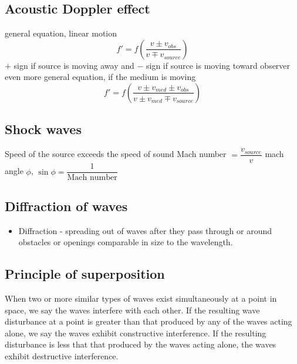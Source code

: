 \documentclass{article}
\begin{document}
\subsection{Acoustic Doppler effect}
\begin{outline}
    \1 general equation, linear motion \[f'=f\left(\dfrac{v\pm v_{obs}}{v\mp v_{source}}\right)\]
    \1 $+$ sign if source is moving away and $-$ sign if source is moving toward observer
    \1 even more general equation, if the medium is moving \[f'=f\left(\dfrac{v\pm v_{med}\pm v_{obs}}{v\pm v_{med}\mp v_{source}}\right)\]
\end{outline}
\subsection{Shock waves}
\begin{outline}
    \1 Speed of the source exceeds the speed of sound
    \1 Mach number $=\dfrac{v_{source}}{v}$
    \1 mach angle $\phi$,  \(\sin\phi=\dfrac{1}{\text{Mach number}}\)
\end{outline}
\subsection{Diffraction of waves}
\begin{itemize}
    \item Diffraction - spreading out of waves after they pass through or around obstacles or openings comparable in size to the wavelength. 
\end{itemize}
\subsection{Principle of superposition}
\begin{outline}
\1 When two or more similar types of waves exist simultaneously at a point in space, we say the waves interfere with each other. If the resulting wave disturbance at a point is greater than that produced by any of the waves acting alone, we say the waves exhibit constructive interference. If the resulting disturbance is less that that produced by the waves acting alone, the waves exhibit destructive interference. 
\end{outline}
\end{document}
